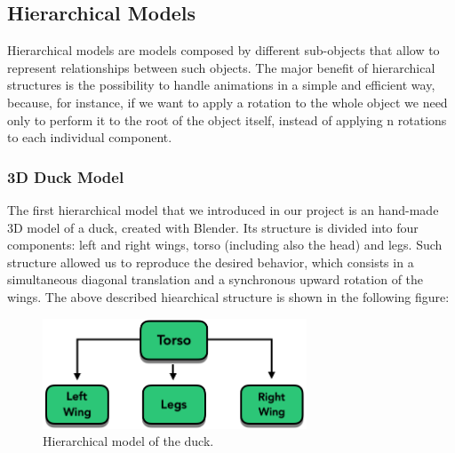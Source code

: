 \documentclass[12pt,a4paper]{article}
\begin{document}
\subsection{Hierarchical Models}
Hierarchical models are models composed by different sub-objects that allow to represent relationships between such objects. The major benefit of hierarchical structures is the possibility to handle animations in a simple and efficient way, because, for instance, if we want to apply a rotation to the whole object we need only to perform it to the root of the object itself, instead of applying n rotations to each individual component.
\subsubsection{3D Duck Model}
The first hierarchical model that we introduced in our project is an hand-made 3D model of a duck, created with Blender. Its structure is divided into four components: left and right wings, torso (including also the head) and legs. Such structure allowed us to reproduce the desired behavior, which consists in a simultaneous diagonal translation and a synchronous upward rotation of the wings. The above described hiearchical structure is shown in the following figure:
\begin{figure}[hbt!]
	\centering
	\includegraphics[width=0.7\textwidth]{hier_duck}
	\caption{Hierarchical model of the duck.}
	\label{fig2}
\end{figure}
\end{document}
